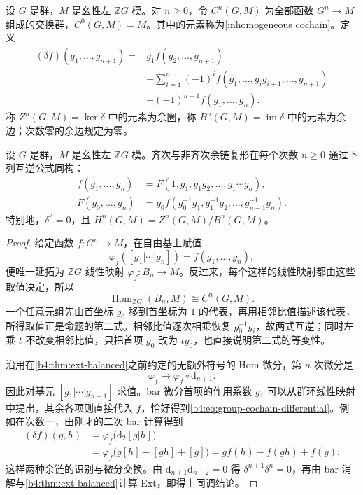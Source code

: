 \begin{definition}\label{b4:def:group-inhomogeneous-cochains}
	设 \(G\) 是群，\(M\) 是幺性左 \(\mathbb ZG\) 模。对 \(n\ge0\)，令 \(C^n(G,M)\) 为全部函数 \(G^n\to M\) 组成的交换群，\(C^0(G,M)=M\)。其中的元素称为[inhomogeneous cochain]。定义
	\begin{equation}\label{b4:eq:group-cochain-differential}
		\begin{split}
			(\delta f)(g_1,\ldots,g_{n+1}) ={}&g_1f(g_2,\ldots,g_{n+1})\\
			&+\sum_{i=1}^{n}(-1)^i f(g_1,\ldots,g_i g_{i+1},\ldots,g_{n+1})\\
			&+(-1)^{n+1}f(g_1,\ldots,g_n).
		\end{split}
	\end{equation}
	称 \(Z^n(G,M)=\ker\delta\) 中的元素为余圈，称 \(B^n(G,M)=\operatorname{im}\delta\) 中的元素为余边；次数零的余边规定为零。
\end{definition}

\begin{proposition}\label{b4:prop:group-cochain-model}
	设 \(G\) 是群，\(M\) 是幺性左 \(\mathbb ZG\) 模。齐次与非齐次余链复形在每个次数 \(n\ge0\) 通过下列互逆公式同构：
	\[
		\begin{split}
			f(g_1,\ldots,g_n)&=F(1,g_1,g_1g_2,\ldots,g_1\cdots g_n),\\
			F(g_0,\ldots,g_n)&=g_0f(g_0^{-1}g_1,g_1^{-1}g_2,\ldots,g_{n-1}^{-1}g_n).
		\end{split}
	\]
	特别地，\(\delta^2=0\)，且 \(H^n(G,M)=Z^n(G,M)/B^n(G,M)\)。
\end{proposition}
\begin{proof}
	给定函数 \(f:G^n\to M\)，在自由基上赋值
	\[
		\varphi_f([g_1|\cdots|g_n])=f(g_1,\ldots,g_n),
	\]
	便唯一延拓为 \(\mathbb ZG\) 线性映射 \(\varphi_f:B_n\to M\)。反过来，每个这样的线性映射都由这些取值决定，所以
	\[
		\operatorname{Hom}_{\mathbb ZG}(B_n,M)\cong C^n(G,M).
	\]
	一个任意元组先由首坐标 \(g_0\) 移到首坐标为 \(1\) 的代表，再用相邻比值描述该代表，所得取值正是命题的第二式。相邻比值逐次相乘恢复 \(g_0^{-1}g_i\)，故两式互逆；同时左乘 \(t\) 不改变相邻比值，只把首项 \(g_0\) 改为 \(tg_0\)，也直接说明第二式的等变性。

	沿用在\cref{b4:thm:ext-balanced}之前约定的无额外符号的 Hom 微分，第 \(n\) 次微分是
	\[
		\varphi_f\longmapsto\varphi_f\circ\mathrm{d}_{n+1}.
	\]
	因此对基元 \([g_1|\cdots|g_{n+1}]\) 求值。bar 微分首项的作用系数 \(g_1\) 可以从群环线性映射中提出，其余各项则直接代入 \(f\)，恰好得到\eqref{b4:eq:group-cochain-differential}。例如在次数一，由刚才的二次 bar 计算得到
	\[
		\begin{aligned}
			(\delta f)(g,h) &=\varphi_f\bigl(\mathrm{d}_2[g|h]\bigr)\\
			&=\varphi_f\bigl(g[h]-[gh]+[g]\bigr) =g f(h)-f(gh)+f(g).
		\end{aligned}
	\]
	这样两种余链的识别与微分交换。由 \(\mathrm{d}_{n+1}\mathrm{d}_{n+2}=0\) 得 \(\delta^{n+1}\delta^n=0\)，再由 bar 消解与\cref{b4:thm:ext-balanced}计算 Ext，即得上同调结论。
\end{proof}

